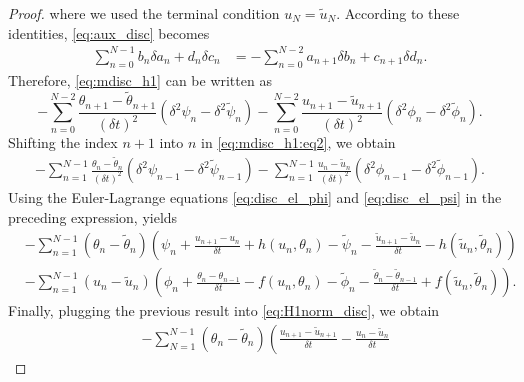 \documentclass[12pt]{amsart}
\newcommand{\1}{{\chi}}
\newcommand{\lb}{\left(}
\newcommand{\rb}{\right)}
\theoremstyle{definition}
\begin{document}
\begin{proof}
                where we used the terminal condition $u_N=\tilde u_N$.
                        According to these identities, \eqref{eq:aux_disc} becomes
                \begin{align*}
                        \sum_{n=0}^{N-1} b_n \delta a_n + d_n \delta c_n &= -\sum_{n=0}^{N-2} a_{n+1} \delta b_n + c_{n+1} \delta d_n.
                \end{align*}
                Therefore, \eqref{eq:mdisc_h1} can be written as
                \begin{equation}\label{eq:mdisc_h1:eq2}
                        -\sum_{n=0}^{N-2}\frac{\theta_{n+1}-\tilde\theta_{n+1}}{(\delta t)^2} \lb \delta^2 \psi_n - \delta^2 \tilde \psi_n \rb
                        -\sum_{n=0}^{N-2}\frac{u_{n+1}-\tilde u_{n+1}}{(\delta t)^2} \lb \delta^2 \phi_n - \delta^2 \tilde \phi_n \rb.
                \end{equation}
                Shifting the index $n+1$ into $n$ in \eqref{eq:mdisc_h1:eq2}, we obtain
                \begin{align*}
                        -\sum_{n=1}^{N-1}\frac{\theta_{n}-\tilde\theta_{n}}{(\delta t)^2} \lb \delta^2 \psi_{n-1} - \delta^2 \tilde \psi_{n-1} \rb
                        -\sum_{n=1}^{N-1}\frac{u_{n}-\tilde u_{n}}{(\delta t)^2} \lb \delta^2 \phi_{n-1} - \delta^2 \tilde \phi_{n-1} \rb.
                \end{align*}
                Using the Euler-Lagrange equations \eqref{eq:disc_el_phi} and \eqref{eq:disc_el_psi} in the preceding expression,  yields
                \begin{align*}
                        &-\sum_{n=1}^{N-1} (\theta_n-\tilde \theta_n) \lb \psi_n + \frac{u_{n+1}-u_n}{\delta t} + h(u_n,\theta_n) 
                                - \tilde\psi_n - \frac{\tilde u_{n+1}-\tilde u_n}{\delta t} - h(\tilde u_n,\tilde \theta_n)\rb \\
                        &-\sum_{n=1}^{N-1} (u_n-\tilde u_n) \lb \phi_n + \frac{\theta_n - \theta_{n-1}}{\delta t} - f(u_n,\theta_n) 
                                - \tilde \phi_n - \frac{\tilde\theta_n - \tilde \theta_{n-1}}{\delta t} + f(\tilde u_n, \tilde \theta_n)\rb.
                \end{align*}
                Finally, plugging the previous result into \eqref{eq:H1norm_disc}, we obtain
                \begin{align*}
                        &-\sum_{N=1}^{N-1} (\theta_n-\tilde \theta_n) \lb \frac{u_{n+1}-\tilde u_{n+1}}{\delta t} - \frac{ u_{n}- \tilde u_n}{\delta t} 

\end{align*}
\end{proof}
\end{document}
